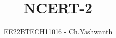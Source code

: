 \documentclass[journal,12pt,twocolumn]{IEEEtran}
\theoremstyle{remark}
\begin{document}
%




\vspace{3cm}

\title{
NCERT-2
}
\author{EE22BTECH11016 - Ch.Yashwanth}


\maketitle

\newpage


\bigskip

\renewcommand{\thefigure}{\theenumi}
\renewcommand{\thetable}{\theenumi}


\providecommand{\pr}[1]{\ensuremath{\Pr\left(#1\right)}}
\providecommand{\prt}[2]{\ensuremath{p_{#1}^{\left(#2\right)} }}        %
\providecommand{\qfunc}[1]{\ensuremath{Q\left(#1\right)}}
\providecommand{\sbrak}[1]{\ensuremath{{}\left[#1\right]}}
\providecommand{\lsbrak}[1]{\ensuremath{{}\left[#1\right.}}
\providecommand{\rsbrak}[1]{\ensuremath{{}\left.#1\right]}}
\providecommand{\brak}[1]{\ensuremath{\left(#1\right)}}
\providecommand{\lbrak}[1]{\ensuremath{\left(#1\right.}}
\providecommand{\rbrak}[1]{\ensuremath{\left.#1\right)}}
\providecommand{\cbrak}[1]{\ensuremath{\left\{#1\right\}}}
\providecommand{\lcbrak}[1]{\ensuremath{\left\{#1\right.}}
\providecommand{\rcbrak}[1]{\ensuremath{\left.#1\right\}}}
\newcommand{\sgn}{\mathop{\mathrm{sgn}}}
\providecommand{\abs}[1]{\left\vert#1\right\vert}
\providecommand{\res}[1]{\Res\displaylimits_{#1}} 
\providecommand{\norm}[1]{\left\lVert#1\right\rVert}
\providecommand{\mtx}[1]{\mathbf{#1}}
\providecommand{\mean}[1]{E\left[ #1 \right]}
\providecommand{\cond}[2]{#1\middle|#2}
\providecommand{\fourier}{\overset{\mathcal{F}}{ \rightleftharpoons}}
\newenvironment{amatrix}[1]{%
  \left(\begin{array}{@{}*{#1}{c}|c@{}}
}{%
  \end{array}\right)
}
\end{document}
